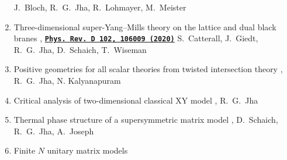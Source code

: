 \begin{enumerate}
 J.~Bloch, R.~G.~Jha, R.~Lohmayer, M.~Meister
 \vspace{1mm} 
 \item Three-dimensional super-Yang--Mills theory on the lattice and dual black branes \newline 
 \textbf{\texttt{}}, \textbf{\texttt{\textcolor{blue}{\href{https://journals.aps.org/prd/abstract/10.1103/PhysRevD.102.106009}{Phys.\ Rev.\ D {\bf 102}, 106009 (2020)}}}} \newline 
 S.~Catterall, J.~Giedt, R.~G.~Jha, D.~Schaich, T.~Wiseman 
 \vspace{1mm} 
 \item Positive geometries for all scalar theories from twisted intersection theory \newline 
  \texttt{\textbf{}},  \texttt{\textbf{}} \newline 
  R.~G.~Jha, N. Kalyanapuram 
  \vspace{1mm} 
  \item Critical analysis of two-dimensional classical XY model \newline 
  \texttt{\textbf{}}, \texttt{\textbf{}} \newline 
  R.~G.~Jha
  \vspace{1mm} 
 \item Thermal phase structure of a supersymmetric matrix model \newline 
 \texttt{\textbf{}}, \texttt{\textbf{}} \newline 
 D.~Schaich, R.~G.~Jha, A.~Joseph
   \vspace{1mm} 
 \item  Finite $N$ unitary matrix models \newline 
 \textbf{\texttt{}} \newline 

\end{enumerate}
